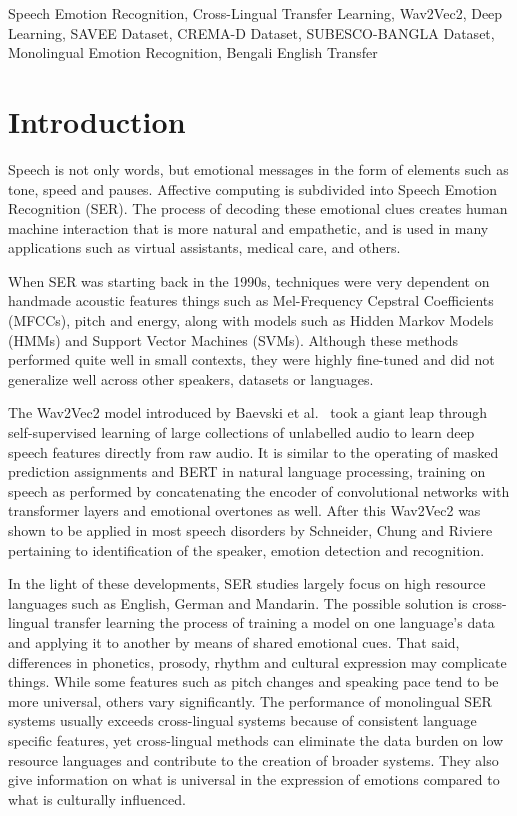 \documentclass[conference]{IEEEtran}
\begin{document}
\begin{IEEEkeywords}
Speech Emotion Recognition, Cross-Lingual Transfer Learning, Wav2Vec2, Deep Learning, SAVEE Dataset, CREMA-D Dataset, SUBESCO-BANGLA Dataset, Monolingual Emotion Recognition, Bengali English Transfer
\end{IEEEkeywords}

\section{Introduction}

Speech is not only words, but emotional messages in the form of elements such as tone, speed
and pauses. Affective computing is subdivided into Speech Emotion Recognition (SER). The
process of decoding these emotional clues creates human machine interaction that is more
natural and empathetic, and is used in many applications such as virtual assistants, medical
care, and others.

When SER was starting back in the 1990s, techniques were very dependent on handmade
acoustic features things such as Mel-Frequency Cepstral Coefficients (MFCCs), pitch and
energy, along with models such as Hidden Markov Models (HMMs) and Support Vector
Machines (SVMs). Although these methods performed quite well in small contexts, they were
highly fine-tuned and did not generalize well across other speakers, datasets or languages.

The Wav2Vec2 model introduced by Baevski et al.~\cite{baevski2020} took a giant leap
through self-supervised learning of large collections of unlabelled audio to learn deep speech
features directly from raw audio. It is similar to the operating of masked prediction assignments and BERT in natural language processing, training on speech as performed by concatenating the encoder of convolutional networks with transformer layers and emotional overtones as well. After this Wav2Vec2 was shown to be applied in most speech disorders by Schneider, Chung and Riviere \cite{schneider2019,chung2019,riviere2020} pertaining to identification of the speaker, emotion detection and recognition.

In the light of these developments, SER studies largely focus on high resource languages such
as English, German and Mandarin. The possible solution is cross-lingual transfer
learning the process of training a model on one language's data and applying it to another by
means of shared emotional cues. That said, differences in phonetics, prosody, rhythm and
cultural expression may complicate things. While some features such as pitch changes and
speaking pace tend to be more universal, others vary significantly. The performance of
monolingual SER systems usually exceeds cross-lingual systems because of consistent
language specific features, yet cross-lingual methods can eliminate the data burden on
low resource languages and contribute to the creation of broader systems. They also give
information on what is universal in the expression of emotions compared to what is culturally
influenced.
\end{document}
